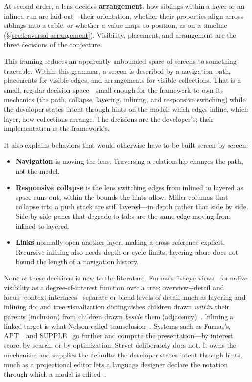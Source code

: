 \documentclass[sigplan,review,anonymous,10pt]{acmart}
\begin{document}
At second order, a lens decides \textbf{arrangement}: how siblings within a layer or an inlined run are laid out---their orientation, whether their properties align across siblings into a table, or whether a value maps to position, as on a timeline (\S\ref{sec:traversal-arrangement}). Visibility, placement, and arrangement are the three decisions of the conjecture.

This framing reduces an apparently unbounded space of screens to something tractable. Within this grammar, a screen is described by a navigation path, placements for visible edges, and arrangements for visible collections. That is a small, regular decision space---small enough for the framework to own its mechanics (the path, collapse, layering, inlining, and responsive switching) while the developer states intent through hints on the model: which edges inline, which layer, how collections arrange. The decisions are the developer's; their implementation is the framework's.

It also explains behaviors that would otherwise have to be built screen by screen:
\begin{itemize}
\item \textbf{Navigation} is moving the lens. Traversing a relationship changes the path, not the model.
\item \textbf{Responsive collapse} is the lens switching edges from inlined to layered as space runs out, within the bounds the hints allow. Miller columns that collapse into a push stack are still layered---in depth rather than side by side. Side-by-side panes that degrade to tabs are the same edge moving from inlined to layered.
\item \textbf{Links} normally open another layer, making a cross-reference explicit. Recursive inlining also needs depth or cycle limits; layering alone does not bound the length of a navigation history.
\end{itemize}

None of these decisions is new to the literature. Furnas's fisheye views~\cite{furnas1986} formalize visibility as a degree-of-interest function over a tree; overview+detail and focus+context interfaces~\cite{cockburn2008} separate or blend levels of detail much as layering and inlining do; and tree visualization distinguishes children drawn \emph{within} their parents (inclusion) from children drawn \emph{beside} them (adjacency)~\cite{schulz2011}. Inlining a linked target is what Nelson called transclusion~\cite{nelson1981}. Systems such as Furnas's, APT~\cite{mackinlay1986}, and SUPPLE~\cite{supple2004} go further and compute the presentation---by interest score, by search, or by optimization. Strvct deliberately does not. It owns the mechanism and supplies the defaults; the developer states intent through hints, much as a projectional editor lets a language designer declare the notation through which a model is edited~\cite{voelter2014}.
\end{document}
